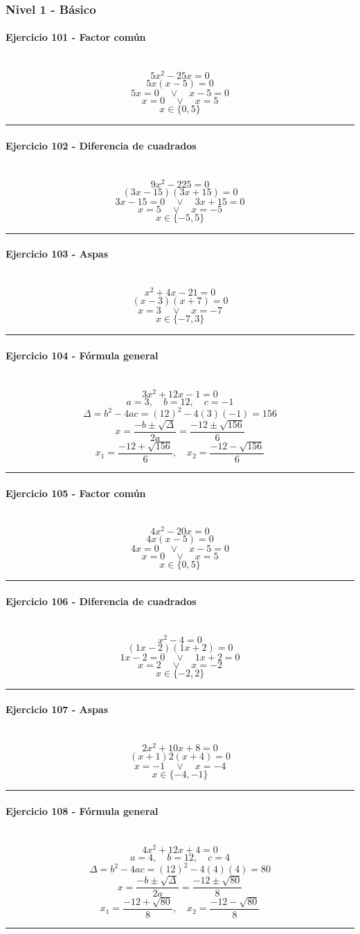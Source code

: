 \documentclass[10pt,a4paper]{article}
\newcommand{\res}[1]{\paragraph{#1}\mbox{}\\[-1.2em]}
\begin{document}
\subsubsection*{Nivel 1 - Básico}
\res{Ejercicio 101 - Factor común}
\[ 5 x^{2} - 25 x=0 \]
\[ 5x(x-5)=0 \]
\[ 5x=0 \quad \vee \quad x-5=0 \]
\[ x=0 \quad \vee \quad x=5 \]
\[ \boxed{x\in\{0,5\}} \]
\vspace{1mm}\hrule\vspace{2mm}
\res{Ejercicio 102 - Diferencia de cuadrados}
\[ 9 x^{2} - 225=0 \]
\[ (3x-15)(3x+15)=0 \]
\[ 3x-15=0 \quad \vee \quad 3x+15=0 \]
\[ x=5 \quad \vee \quad x=-5 \]
\[ \boxed{x\in\{-5,5\}} \]
\vspace{1mm}\hrule\vspace{2mm}
\res{Ejercicio 103 - Aspas}
\[ x^{2} + 4 x - 21=0 \]
\[ (x-3)(x+7)=0 \]
\[ x=3 \quad \vee \quad x=-7 \]
\[ \boxed{x\in\{-7,3\}} \]
\vspace{1mm}\hrule\vspace{2mm}
\res{Ejercicio 104 - Fórmula general}
\[ 3 x^{2} + 12 x - 1=0 \]
\[ a=3,\quad b=12,\quad c=-1 \]
\[ \Delta=b^2-4ac=(12)^2-4(3)(-1)=156 \]
\[ x=\frac{-b\pm\sqrt{\Delta}}{2a}=\frac{-12\pm\sqrt{156}}{6} \]
\[ \boxed{x_1=\frac{-12+\sqrt{156}}{6},\quad x_2=\frac{-12-\sqrt{156}}{6}} \]
\vspace{1mm}\hrule\vspace{2mm}
\res{Ejercicio 105 - Factor común}
\[ 4 x^{2} - 20 x=0 \]
\[ 4x(x-5)=0 \]
\[ 4x=0 \quad \vee \quad x-5=0 \]
\[ x=0 \quad \vee \quad x=5 \]
\[ \boxed{x\in\{0,5\}} \]
\vspace{1mm}\hrule\vspace{2mm}
\res{Ejercicio 106 - Diferencia de cuadrados}
\[ x^{2} - 4=0 \]
\[ (1x-2)(1x+2)=0 \]
\[ 1x-2=0 \quad \vee \quad 1x+2=0 \]
\[ x=2 \quad \vee \quad x=-2 \]
\[ \boxed{x\in\{-2,2\}} \]
\vspace{1mm}\hrule\vspace{2mm}
\res{Ejercicio 107 - Aspas}
\[ 2 x^{2} + 10 x + 8=0 \]
\[ (x+1)2(x+4)=0 \]
\[ x=-1 \quad \vee \quad x=-4 \]
\[ \boxed{x\in\{-4,-1\}} \]
\vspace{1mm}\hrule\vspace{2mm}
\res{Ejercicio 108 - Fórmula general}
\[ 4 x^{2} + 12 x + 4=0 \]
\[ a=4,\quad b=12,\quad c=4 \]
\[ \Delta=b^2-4ac=(12)^2-4(4)(4)=80 \]
\[ x=\frac{-b\pm\sqrt{\Delta}}{2a}=\frac{-12\pm\sqrt{80}}{8} \]
\[ \boxed{x_1=\frac{-12+\sqrt{80}}{8},\quad x_2=\frac{-12-\sqrt{80}}{8}} \]
\vspace{1mm}\hrule\vspace{2mm}
\end{document}
